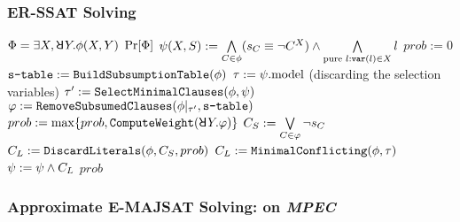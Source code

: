 \begin{frame}
    \frametitle{ER-SSAT Solving}
    {\scriptsize
        \begin{algorithmic}[1]
            \REQUIRE $\Qf=\exists X,\random{} Y.\pf(X,Y)$
            \ENSURE $\Pr[\Phi]$
            \STATE $\psi(X,S) := \bigwedge\limits_{C\in\phi}(s_{C}\equiv\lnot C^X)\land\bigwedge\limits_{\text{pure }l: \texttt{var}(l)\in X}l$\label{code:erssat-init-select}
            \STATE $prob := 0$
            \STATE $\texttt{s-table} := \texttt{BuildSubsumptionTable}(\phi)$\label{code:erssat-subsume-table}
            \WHILE{($\sat{\select}$)}
            \STATE $\tau := \psi.\mathrm{model}$ (discarding the selection variables)
            \IF{($\sat{\pcf{\pf}{\as}}$)}
            \STATE $\tau' := \texttt{SelectMinimalClauses}(\phi,\psi)$\label{code:erssat-minimal-clauses}
            \STATE $\varphi := \texttt{RemoveSubsumedClauses}(\phi|_{\tau'},\texttt{s-table})$\label{code:erssat-subsume-clauses}
            \STATE $prob := \max\{prob,\texttt{ComputeWeight}(\random{} Y.\varphi)\}$\label{code:erssat-wmc}
            \STATE $C_S := \bigvee\limits_{C\in\varphi}\lnot s_{C}$
            \STATE $C_L := \texttt{DiscardLiterals}(\phi,C_S,prob)$\label{code:erssat-discard-literals}
            \ELSE
            \STATE $C_L := \texttt{MinimalConflicting}(\phi,\tau)$
            \ENDIF
            \STATE $\psi := \psi \land C_L$
            \ENDWHILE
            \RETURN $prob$
        \end{algorithmic}
    }
\end{frame}

\begin{frame}
    \frametitle{Approximate E-MAJSAT Solving: \erssatb on \textit{MPEC}}
    \begin{table}[ht]
        \centering
        \scriptsize
    \end{table}
\end{frame}

